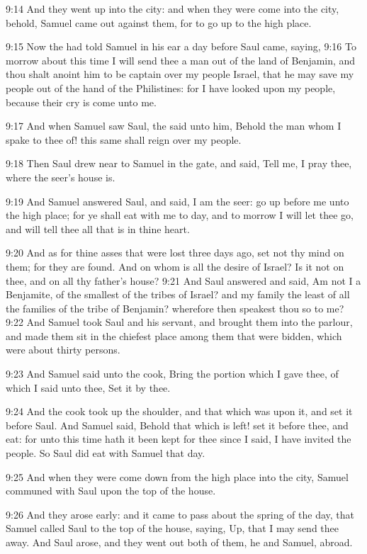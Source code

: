 9:14 And they went up into the city: and when they were come into the city, behold, Samuel came out against them, for to go up to the high place.

9:15 Now the \LORD had told Samuel in his ear a day before Saul came, saying, 9:16 To morrow about this time I will send thee a man out of the land of Benjamin, and thou shalt anoint him to be captain over my people Israel, that he may save my people out of the hand of the Philistines: for I have looked upon my people, because their cry is come unto me.

9:17 And when Samuel saw Saul, the \LORD said unto him, Behold the man whom I spake to thee of! this same shall reign over my people.

9:18 Then Saul drew near to Samuel in the gate, and said, Tell me, I pray thee, where the seer's house is.

9:19 And Samuel answered Saul, and said, I am the seer: go up before me unto the high place; for ye shall eat with me to day, and to morrow I will let thee go, and will tell thee all that is in thine heart.

9:20 And as for thine asses that were lost three days ago, set not thy mind on them; for they are found. And on whom is all the desire of Israel? Is it not on thee, and on all thy father's house?  9:21 And Saul answered and said, Am not I a Benjamite, of the smallest of the tribes of Israel? and my family the least of all the families of the tribe of Benjamin? wherefore then speakest thou so to me?  9:22 And Samuel took Saul and his servant, and brought them into the parlour, and made them sit in the chiefest place among them that were bidden, which were about thirty persons.

9:23 And Samuel said unto the cook, Bring the portion which I gave thee, of which I said unto thee, Set it by thee.

9:24 And the cook took up the shoulder, and that which was upon it, and set it before Saul. And Samuel said, Behold that which is left!  set it before thee, and eat: for unto this time hath it been kept for thee since I said, I have invited the people. So Saul did eat with Samuel that day.

9:25 And when they were come down from the high place into the city, Samuel communed with Saul upon the top of the house.

9:26 And they arose early: and it came to pass about the spring of the day, that Samuel called Saul to the top of the house, saying, Up, that I may send thee away. And Saul arose, and they went out both of them, he and Samuel, abroad.


